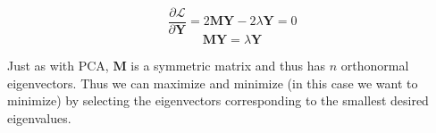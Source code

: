 \documentclass[a4paper, 12pt]{article}
\begin{document}
\begin{enumerate}
	$$ \frac{\partial \mathscr{L} }{\partial \textbf{Y}} = 2 \textbf{MY} - 2\lambda \textbf{Y} = 0  $$
	$$ \textbf{MY} = \lambda \textbf{Y}$$

	Just as with PCA, $\textbf{M}$ is a symmetric matrix and thus has $n$ orthonormal eigenvectors. Thus we can maximize and minimize (in this case we want to minimize) by selecting the eigenvectors corresponding to the smallest desired eigenvalues. 

\end{enumerate}
\end{document}
